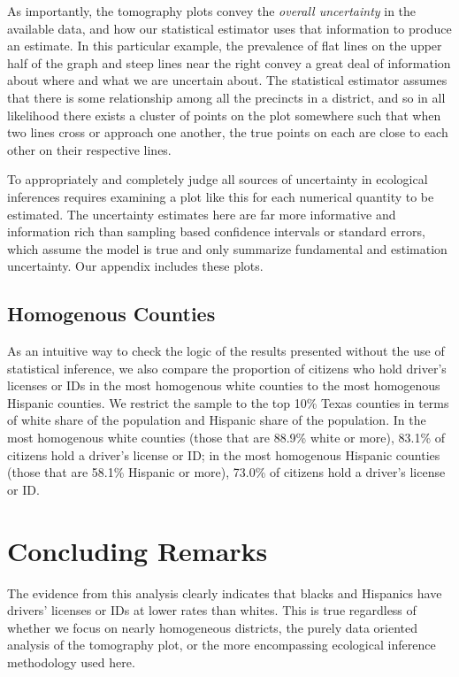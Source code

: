 \documentclass[12pt]{article}
\begin{document}
As importantly, the tomography plots convey the \emph{overall
  uncertainty} in the available data, and how our statistical
estimator uses that information to produce an estimate.  In this
particular example, the prevalence of flat lines on the upper half of
the graph and steep lines near the right convey a great deal of
information about where and what we are uncertain about.  The
statistical estimator assumes that there is some relationship among
all the precincts in a district, and so in all likelihood there exists
a cluster of points on the plot somewhere such that when two lines
cross or approach one another, the true points on each are close to
each other on their respective lines.

To appropriately and completely judge all sources of uncertainty in
ecological inferences requires examining a plot like this for each
numerical quantity to be estimated.  The uncertainty estimates here
are far more informative and information rich than sampling based
confidence intervals or standard errors, which assume the model is
true and only summarize fundamental and estimation uncertainty.  Our
appendix includes these plots.

\subsection{Homogenous Counties}

As an intuitive way to check the logic of the results presented
without the use of statistical inference, we also compare the
proportion of citizens who hold driver's licenses or IDs in the most
homogenous white counties to the most homogenous Hispanic counties. We
restrict the sample to the top 10\% Texas counties in terms of white
share of the population and Hispanic share of the population. In the
most homogenous white counties (those that are 88.9\% white or more),
83.1\% of citizens hold a driver's license or ID; in the most
homogenous Hispanic counties (those that are 58.1\% Hispanic or more),
73.0\% of citizens hold a driver's license or ID.

\section{Concluding Remarks}

The evidence from this analysis clearly indicates that blacks and
Hispanics have drivers' licenses or IDs at lower rates than whites.
This is true regardless of whether we focus on nearly homogeneous
districts, the purely data oriented analysis of the tomography plot,
or the more encompassing ecological inference methodology used here.
\clearpage
\appendix
\renewcommand*\appendixpagename{\section*{Appendix}}
\appendixpage
\end{document}
